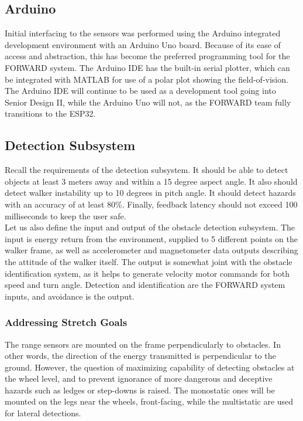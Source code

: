 \subsection{Arduino}
\noindent Initial interfacing to the sensors was performed using the Arduino integrated development environment with an Arduino Uno board. Because of its ease of access and abstraction, this has become the preferred programming tool for the FORWARD system. The Arduino IDE has the built-in serial plotter, which can be integrated with MATLAB for use of a polar plot showing the field-of-vision. The Arduino IDE will continue to be used as a development tool going into Senior Design II, while the Arduino Uno will not, as the FORWARD team fully transitions to the ESP32.\\

\subsection{Detection Subsystem}
\noindent Recall the requirements of the detection subsystem. It should be able to detect objects at least 3 meters away and within a 15 degree aspect angle. It also should detect walker instability up to 10 degrees in pitch angle. It should detect hazards with an accuracy of at least 80\%. Finally, feedback latency should not exceed 100 milliseconds to keep the user safe.\\

\noindent Let us also define the input and output of the obstacle detection subsystem. The input is energy return from the environment, supplied to 5 different points on the walker frame, as well as accelerometer and magnetometer data outputs describing the attitude of the walker itself. The output is somewhat joint with the obstacle identification system, as it helps to generate velocity motor commands for both speed and turn angle. Detection and identification are the FORWARD system inputs, and avoidance is the output.

\subsubsection{Addressing Stretch Goals}
\noindent The range sensors are mounted on the frame perpendicularly to obstacles. In other words, the direction of the energy transmitted is perpendicular to the ground. However, the question of maximizing capability of detecting obstacles at the wheel level, and to prevent ignorance of more dangerous and deceptive hazards such as ledges or step-downs is raised. The monostatic ones will be mounted on the legs near the wheels, front-facing, while the multistatic are used for lateral detections.\\

